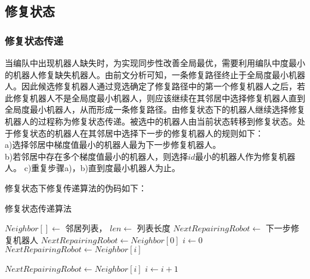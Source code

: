\subsection{修复状态}

\subsubsection{修复状态传递}
当编队中出现机器人缺失时，为实现同步性改善全局最优，需要利用编队中度最小的机器人修复缺失机器人。由前文分析可知，一条修复路径终止于全局度最小机器人。因此候选修复机器人通过竞选确定了修复路径中的第一个修复机器人之后，若此修复机器人不是全局度最小机器人，则应该继续在其邻居中选择修复机器人直到全局度最小机器人，从而形成一条修复路径。由修复状态下的机器人继续选择修复机器人的过程称为修复状态传递。被选中的机器人由当前状态转移到修复状态。处于修复状态的机器人在其邻居中选择下一步的修复机器人的规则如下：\\
\indent a)选择邻居中梯度值最小的机器人最为下一步修复机器人。\\
\indent b)若邻居中存在多个梯度值最小的机器人，则选择$id$最小的机器人作为修复机器人。
\indent c)重复步骤a)，b)直到度最小机器人为止。

修复状态下修复传递算法的伪码如下：\\
\begin{algorithm}
	\caption{修复状态传递算法}
	\label{algorithm:repairing_status_deliever}
	\begin{algorithmic}[1]
		\Require $Neighbor[] \leftarrow$ 邻居列表， $len \leftarrow$ 列表长度
		\Ensure $NextRepairingRobot \leftarrow$ 下一步修复机器人
			\State $NextRepairingRobot \gets Neighbor[0]$
			\State $i \gets 0$
					\State $NextRepairingRobot \gets Neighbor[i]$
	\end{algorithmic}
\end{algorithm}

\begin{algorithm}
	\begin{algorithmic}
				\Else
						\State $NextRepairingRobot \gets Neighbor[i]$
					\EndIf
				\EndIf
				\State $i \gets i+1$
			\EndWhile
			\State {}
		\EndFunction			
	\end{algorithmic}	
\end{algorithm}
	

